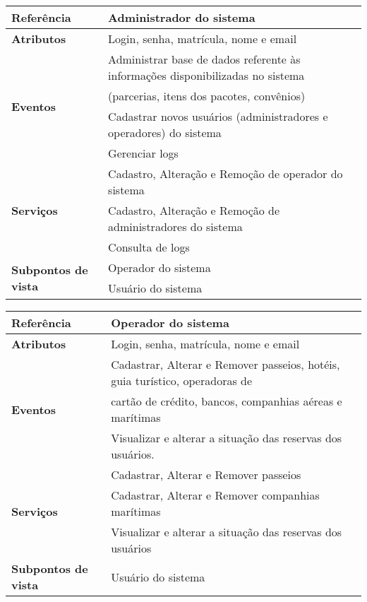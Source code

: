 \documentclass[12pt,twoside,a4paper]{article}
\begin{document}
\begin{table}[H]
\label{tab:VORD01}
\begin{small}
\begin{center}
    \begin{tabular}{ | l | l |}
    \hline
\textbf{Referência} & {Administrador do sistema}\\ \hline
\textbf{Atributos} & Login, senha, matrícula, nome e email \\\hline
\multirow{4}{*}{\textbf{Eventos}} & Administrar base de dados referente às informações disponibilizadas no sistema \\ & (parcerias, itens dos pacotes, convênios) \\ & Cadastrar novos usuários (administradores e operadores) do sistema \\ & Gerenciar logs\\\hline
\multirow{3}{*}{\textbf{Serviços}} & Cadastro, Alteração e Remoção de operador do sistema\\ & Cadastro, Alteração e Remoção de administradores do sistema\\& Consulta de logs\\\hline
\multirow{2}{*}{\textbf{Subpontos de vista}} & Operador do sistema \\ &
Usuário do sistema \\\hline
    \end{tabular}
\end{center}    
\end{small}
\end{table}

\begin{table}[H]
\label{tab:VORD02}
\begin{small}
\begin{center}
    \begin{tabular}{ | l | l |}
    \hline
\textbf{Referência} & {Operador do sistema}\\ \hline
\textbf{Atributos} & Login, senha, matrícula, nome e email \\\hline
\multirow{3}{*}{\textbf{Eventos}} & Cadastrar, Alterar e Remover passeios, hotéis, guia turístico, operadoras de \\& cartão de crédito, bancos, companhias aéreas e marítimas\\ & Visualizar e alterar a situação das reservas dos usuários. \\\hline
\multirow{3}{*}{\textbf{Serviços}} & Cadastrar, Alterar e Remover passeios\\ & Cadastrar, Alterar e Remover companhias marítimas \\& Visualizar e alterar a situação das reservas dos usuários\\\hline
\textbf{Subpontos de vista} & Usuário do sistema\\\hline
    \end{tabular}
\end{center}    
\end{small}
\end{table}
\end{document}
